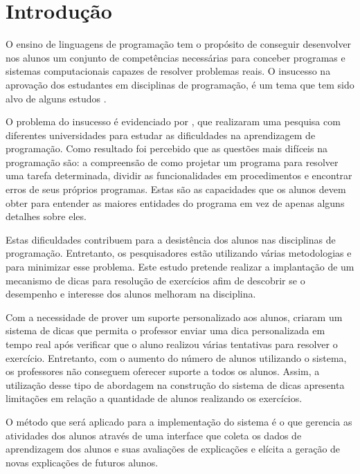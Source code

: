 \chapter{Introdução}

O ensino de linguagens de programação tem o propósito de conseguir desenvolver nos alunos um conjunto de competências necessárias para conceber programas e sistemas computacionais capazes de resolver problemas reais. O insucesso na aprovação dos estudantes em disciplinas de programação, é um tema que tem sido alvo de alguns estudos \cite{bosse2015reprovaccoes, Cukierman:2015:PSU:2729094.2742623}.

O problema do insucesso é evidenciado por , que realizaram uma pesquisa com diferentes universidades para estudar as dificuldades na aprendizagem de programação. Como resultado foi percebido que as questões mais difíceis na programação são: a compreensão de como projetar um programa para resolver uma tarefa determinada, dividir as funcionalidades em procedimentos e encontrar erros de seus próprios programas. Estas são as capacidades que os alunos devem obter para entender as maiores entidades do programa em vez de apenas alguns detalhes sobre eles.

Estas dificuldades contribuem para a desistência dos alunos nas disciplinas de programação. Entretanto, os pesquisadores estão utilizando várias metodologias e  para minimizar esse problema. Este estudo pretende realizar a implantação de um mecanismo de dicas para resolução de exercícios afim de descobrir se o desempenho e interesse dos alunos melhoram na disciplina. 

Com a necessidade de prover um suporte personalizado aos alunos,  criaram um sistema de dicas que permita o professor enviar uma dica personalizada em tempo real após verificar que o aluno realizou várias tentativas para resolver o exercício. Entretanto, com o aumento do número de alunos utilizando o sistema, os professores não conseguem oferecer suporte a todos os alunos. Assim, a utilização desse tipo de abordagem na construção do sistema de dicas apresenta limitações em relação a quantidade de alunos realizando os exercícios.


O método que será aplicado para a implementação do sistema é o  que gerencia as atividades dos alunos através de uma interface que coleta os dados de aprendizagem dos alunos e suas avaliações de explicações e elícita a geração de novas explicações de futuros alunos.

